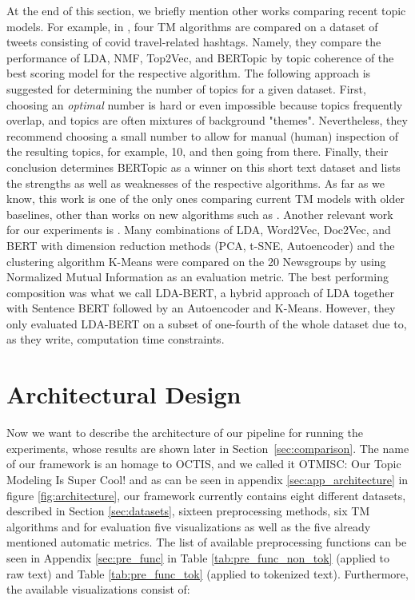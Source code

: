 \documentclass[11pt]{article}
\begin{document}
At the end of this section, we briefly mention other works comparing recent topic models. For example, in \citet{tm_comparison}, four TM algorithms are compared on a dataset of tweets consisting of covid travel-related hashtags. Namely, they compare the performance of LDA, NMF, Top2Vec, and BERTopic by topic coherence of the best scoring model for the respective algorithm. 
The following approach is suggested for determining the number of topics for a given dataset. First, choosing an \emph{optimal} number is hard or even impossible because topics frequently overlap, and topics are often mixtures of background "themes". Nevertheless, they recommend choosing a small number to allow for manual (human) inspection of the resulting topics, for example, 10, and then going from there. Finally, their conclusion determines BERTopic as a winner on this short text dataset and lists the strengths as well as weaknesses of the respective algorithms. As far as we know, this work is one of the only ones comparing current TM models with older baselines, other than works on new algorithms such as \citet{bertopic}. Another relevant work for our experiments is \citet{lda-bert_survey}. Many combinations of LDA, Word2Vec, Doc2Vec, and BERT with dimension reduction methods (PCA, t-SNE, Autoencoder) and the clustering algorithm K-Means were compared on the 20 Newsgroups by using Normalized Mutual Information as an evaluation metric. The best performing composition was what we call LDA-BERT, a hybrid approach of LDA together with Sentence BERT followed by an Autoencoder and K-Means. However, they only evaluated LDA-BERT on a subset of one-fourth of the whole dataset due to, as they write, computation time constraints.

\section{Architectural Design}
\label{sec:design}

Now we want to describe the architecture of our pipeline for running the experiments, whose results are shown later in Section~\ref{sec:comparison}. The name of our framework is an homage to OCTIS, and we called it OTMISC: Our Topic Modeling Is Super Cool! and as can be seen in appendix \ref{sec:app_architecture} in figure \ref{fig:architecture}, our framework currently contains eight different datasets, described in Section \ref{sec:datasets}, sixteen preprocessing methods, six TM algorithms and for evaluation five visualizations as well as the five already mentioned automatic metrics. The list of available preprocessing functions can be seen in Appendix \ref{sec:pre_func} in Table \ref{tab:pre_func_non_tok} (applied to raw text) and Table \ref{tab:pre_func_tok} (applied to tokenized text). Furthermore, the available visualizations consist of:
\end{document}
